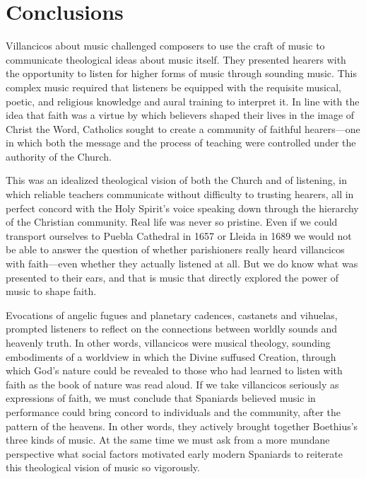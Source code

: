 
\section{Conclusions}

Villancicos about music challenged composers to use the craft of music to
communicate theological ideas about music itself.
They presented hearers with the opportunity to listen for higher forms of music
through sounding music.
This complex music required that listeners be equipped with the requisite
musical, poetic, and religious knowledge and aural training to interpret it.
In line with the idea that faith was a virtue by which believers shaped
their lives in the image of Christ the Word, Catholics sought to create a
community of faithful hearers---one in which both the message and the process
of teaching were controlled under the authority of the Church.


This was an idealized theological vision of both the Church and of listening,
in which reliable teachers communicate without difficulty to trusting hearers,
all in perfect concord with the Holy Spirit's voice speaking down through the
hierarchy of the Christian community.
Real life was never so pristine.
Even if we could transport ourselves to Puebla Cathedral in 1657 or Lleida in
1689 we would not be able to answer the question of whether parishioners really
heard villancicos with faith---even whether they actually listened at all.
But we do know what was presented to their ears, and that is music that
directly explored the power of music to shape faith.


Evocations of angelic fugues and planetary cadences, castanets and vihuelas,
prompted listeners to reflect on the connections between worldly sounds and
heavenly truth.
In other words, villancicos were musical theology, sounding embodiments of a
worldview in which the Divine suffused Creation, through which God's nature
could be revealed to those who had learned to listen with faith as the book of
nature was read aloud.
If we take villancicos seriously as expressions of faith, we must conclude that
Spaniards believed music in performance could bring concord to individuals and
the community, after the pattern of the heavens.
In other words, they actively brought together Boethius's three kinds of music.
At the same time we must ask from a more mundane perspective what social
factors motivated early modern Spaniards to reiterate this theological vision
of music so vigorously.

